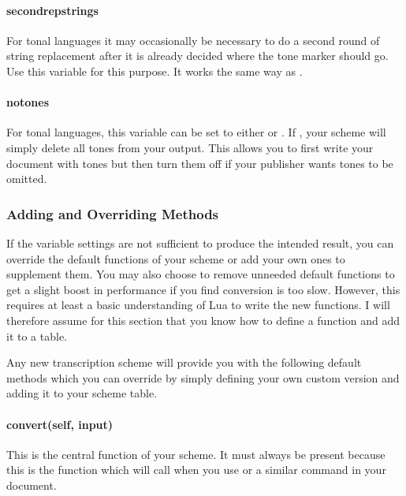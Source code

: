 \documentclass{ltxdockit}
\begin{document}
\paragraph{second\textunderscore{}rep\textunderscore{}strings}

For tonal languages it may occasionally be necessary to do a second round of
string replacement after it is already decided where the tone marker should go.
Use this variable for this purpose. It works the same way as
.

\paragraph{no\textunderscore{}tones}

For tonal languages, this variable can be set to either  or
. If , your scheme will simply delete all tones from your
output. This allows you to first write your document with tones but then turn
them off if your publisher wants tones to be omitted.

\subsubsection{Adding and Overriding Methods}

If the variable settings are not sufficient to produce the intended result, you
can override the default functions of your scheme or add your own ones to
supplement them. You may also choose to remove unneeded default functions to get
a slight boost in performance if you find conversion is too slow. However, this
requires at least a basic understanding of Lua to write the new functions. I
will therefore assume for this section that you know how to define a function
and add it to a table.


Any new transcription scheme will provide you with the following default methods
which you can override by simply defining your own custom version and adding it
to your scheme table.

\paragraph{convert(self, input)}

This is the central function of your scheme. It must always be present because
this is the function which  will call when you use
 or a similar command in your document.
\end{document}
